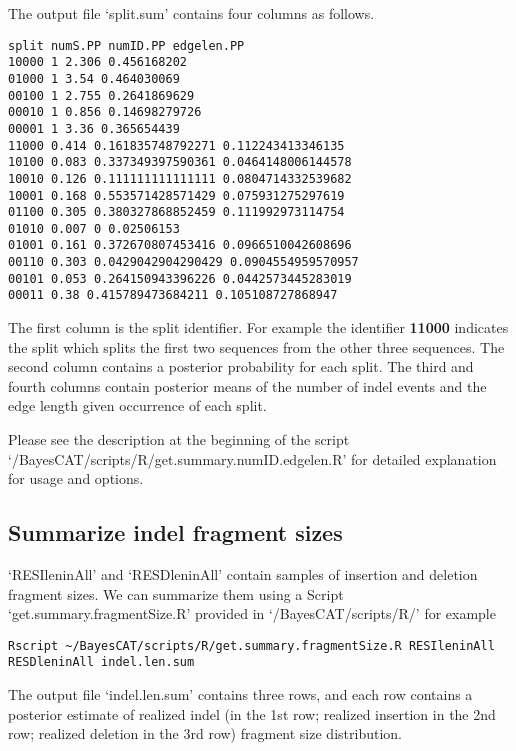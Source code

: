 \documentclass[11pt]{article}
\begin{document}
The output file `split.sum' contains four columns as follows.
\begin{lstlisting}
split numS.PP numID.PP edgelen.PP
10000 1 2.306 0.456168202
01000 1 3.54 0.464030069
00100 1 2.755 0.2641869629
00010 1 0.856 0.14698279726
00001 1 3.36 0.365654439
11000 0.414 0.161835748792271 0.112243413346135
10100 0.083 0.337349397590361 0.0464148006144578
10010 0.126 0.111111111111111 0.0804714332539682
10001 0.168 0.553571428571429 0.075931275297619
01100 0.305 0.380327868852459 0.111992973114754
01010 0.007 0 0.02506153
01001 0.161 0.372670807453416 0.0966510042608696
00110 0.303 0.0429042904290429 0.0904554959570957
00101 0.053 0.264150943396226 0.0442573445283019
00011 0.38 0.415789473684211 0.105108727868947
\end{lstlisting}
The first column is the split identifier. For example the identifier \textbf{11000} indicates the split which splits the first two sequences from the other three sequences. The second column contains a posterior probability for each split. The third and fourth columns contain posterior means of the number of indel events and the edge length given occurrence of each split.

Please see the description at the beginning of the script `/BayesCAT/scripts/R/get.summary.numID.edgelen.R' for detailed explanation for usage and options.

\subsection{Summarize indel fragment sizes}
\label{sec-3-5}
`RESIleninAll' and `RESDleninAll' contain samples of insertion and deletion fragment sizes. We can summarize them using a Script `get.summary.fragmentSize.R' provided in `/BayesCAT/scripts/R/' for example
\begin{lstlisting}
Rscript ~/BayesCAT/scripts/R/get.summary.fragmentSize.R RESIleninAll RESDleninAll indel.len.sum
\end{lstlisting}
The output file `indel.len.sum' contains three rows, and each row contains a posterior estimate of realized indel (in the 1st row; realized insertion in the 2nd row; realized deletion in the 3rd row) fragment size distribution.
\end{document}
